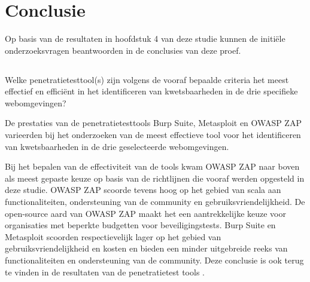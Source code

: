 
\chapter{Conclusie}%
\label{ch:conclusie}


Op basis van de resultaten in hoofdstuk 4 van deze studie kunnen de initiële onderzoeksvragen beantwoorden in de 
conclusies van deze proef.

\section{}
  Welke penetratietesttool(s) zijn volgens de vooraf bepaalde criteria het meest effectief en efficiënt in het 
  identificeren van kwetsbaarheden in de drie specifieke webomgevingen?

  De prestaties van de penetratietesttools Burp Suite, Metasploit en OWASP ZAP varieerden bij het onderzoeken van de 
  meest effectieve tool voor het identificeren van kwetsbaarheden in de drie geselecteerde webomgevingen.

  Bij het bepalen van de effectiviteit van de tools kwam OWASP ZAP naar boven als meest gepaste keuze op basis van de richtlijnen 
  die vooraf werden opgesteld in deze studie. OWASP ZAP scoorde tevens hoog op het gebied van scala aan functionaliteiten, 
  ondersteuning van de community en gebruiksvriendelijkheid. De open-source aard van OWASP ZAP maakt het een aantrekkelijke 
  keuze voor organisaties met beperkte budgetten voor beveiligingstests. Burp Suite en Metasploit scoorden respectievelijk 
  lager op het gebied van gebruiksvriendelijkheid en kosten en bieden een minder uitgebreide reeks van functionaliteiten en 
  ondersteuning van de community. Deze conclusie is ook terug te vinden in de resultaten van de penetratietest tools 
  .

